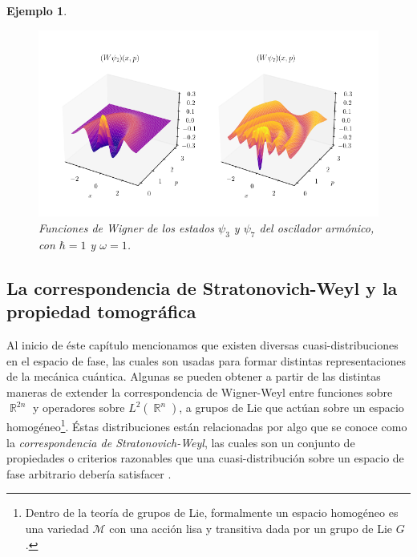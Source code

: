 \documentclass[a4paper,11pt]{report}
\DeclareMathOperator{\R}{\mathbb{R}}
\newtheorem{example}{Ejemplo}
\begin{document}
\begin{example}
    \begin{figure}[ht]
      \centering
      \includegraphics[width=1\textwidth]{
        imgs/harmonic_osc_wigner.png
      }
      \caption{Funciones de Wigner de los estados $\psi_3$ y
      $\psi_7$ del oscilador armónico, con $\hbar = 1$ y
      $\omega = 1$.}
      \label{fig:harmonic_osc_wigner_3_7}
    \end{figure}
  \end{example}
  
  \subsection{La correspondencia de Stratonovich-Weyl y la
  propiedad tomográfica}

  Al inicio de éste capítulo mencionamos que existen
  diversas cuasi-distribuciones en el espacio de fase, las
  cuales son usadas para formar distintas representaciones
  de la mecánica cuántica. Algunas se pueden obtener a
  partir de las distintas maneras de extender la
  correspondencia de Wigner-Weyl entre funciones sobre
  $\R^{2n}$ y operadores sobre $L^2(\R^{n})$, a grupos de
  Lie que actúan sobre un espacio homogéneo\footnote{Dentro
    de la teoría de grupos de Lie, formalmente un espacio
  homogéneo es una variedad $\mathcal M$ con una acción lisa
  y transitiva dada por un grupo de Lie $G$.}. Éstas
  distribuciones están relacionadas por algo que se conoce
  como la \textit{correspondencia de Stratonovich-Weyl}, las
  cuales son un conjunto de propiedades o criterios
  razonables que una cuasi-distribución sobre un espacio de
  fase arbitrario debería satisfacer \cite{cahen}. 
\end{document}
